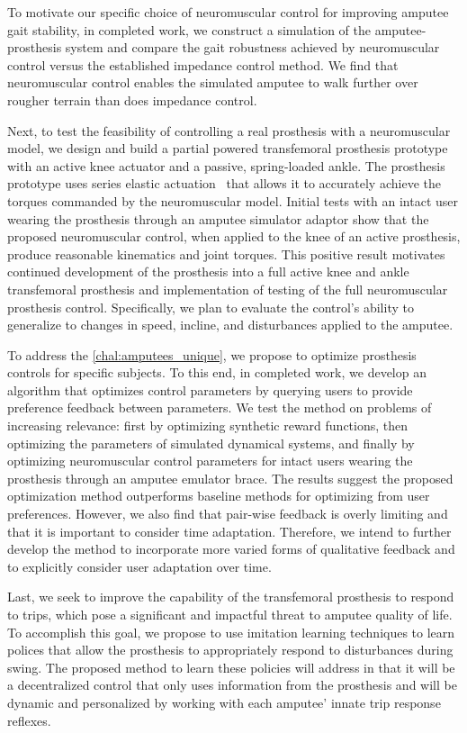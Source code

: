To motivate our specific choice of neuromuscular control for improving amputee
gait stability, in completed work, we construct a simulation of the
amputee-prosthesis system and compare the gait robustness achieved by
neuromuscular control versus the established impedance control method. We find
that neuromuscular control enables the simulated amputee to walk further over
rougher terrain than does impedance control.

Next, to test the feasibility of controlling a real prosthesis with a
neuromuscular model, we design and build a partial powered transfemoral
prosthesis prototype with an active knee actuator and a passive, spring-loaded
ankle. The prosthesis prototype uses series elastic
actuation~\citep{pratt1995series} that allows it to accurately achieve the
torques commanded by the neuromuscular model. Initial tests with an intact user
wearing the prosthesis through an amputee simulator adaptor show that the
proposed neuromuscular control, when applied to the knee of an active
prosthesis, produce reasonable kinematics and joint torques. This positive
result motivates continued development of the prosthesis into a full active knee
and ankle transfemoral prosthesis and implementation of testing of the full
neuromuscular prosthesis control. Specifically, we plan to evaluate the
control's ability to generalize to changes in speed, incline, and disturbances
applied to the amputee.

To address the \cref{chal:amputees_unique}, we propose to optimize prosthesis
controls for specific subjects. To this end, in completed work, we develop an
algorithm that optimizes control parameters by querying users to provide
preference feedback between parameters. We test the method on problems of
increasing relevance: first by optimizing synthetic reward functions, then
optimizing the parameters of simulated dynamical systems, and finally by
optimizing neuromuscular control parameters for intact users wearing the
prosthesis through an amputee emulator brace. The results suggest the proposed
optimization method outperforms baseline methods for optimizing from user
preferences. However, we also find that pair-wise feedback is overly limiting
and that it is important to consider time adaptation. Therefore, we intend to
further develop the method to incorporate more varied forms of qualitative
feedback and to explicitly consider user adaptation over time.

Last, we seek to improve the capability of the transfemoral prosthesis to
respond to trips, which pose a significant and impactful threat to amputee
quality of life. To accomplish this goal, we propose to use imitation learning
techniques \citep{argall2009survey} to learn polices that allow the prosthesis
to appropriately respond to disturbances during swing.  The proposed method to
learn these policies will address 
in that it will be a decentralized control that only uses information from the
prosthesis and will be dynamic and personalized by working with each amputee'
innate trip response reflexes.

